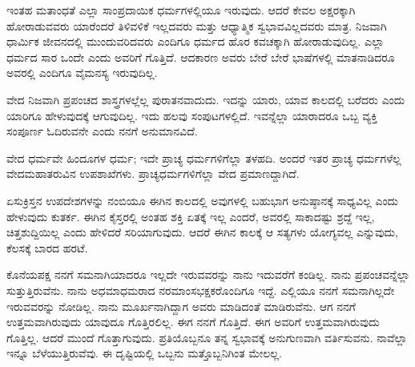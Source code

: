 ಇಂತಹ ಮತಾಂಧತೆ ಎಲ್ಲಾ ಸಾಂಪ್ರದಾಯಿಕ ಧರ್ಮಗಳಲ್ಲಿಯೂ ಇರುವುದು. ಆದರೆ ಕೇವಲ ಅಕ್ಷರಕ್ಕಾಗಿ ಹೋರಾಡುವವರು ಯಾರೆಂದರೆ ತಿಳಿವಳಿಕೆ ಇಲ್ಲದವರು ಮತ್ತು ಆಧ್ಯಾತ್ಮಿಕ ಸ್ವಭಾವವಿಲ್ಲದವರು ಮಾತ್ರ. ನಿಜವಾಗಿ ಧಾರ್ಮಿಕ ಜೀವನದಲ್ಲಿ ಮುಂದುವರಿದವರು ಎಂದಿಗೂ ಧರ್ಮದ ಹೊರ ಕವಚಕ್ಕಾಗಿ ಹೋರಾಡುವುದಿಲ್ಲ. ಎಲ್ಲಾ ಧರ್ಮದ ಸಾರ ಒಂದೇ ಎಂದು ಅವರಿಗೆ ಗೊತ್ತಿದೆ. ಆದಕಾರಣ ಅವರು ಬೇರೆ ಬೇರೆ ಭಾಷೆಗಳಲ್ಲಿ ಮಾತನಾಡಿದರೂ ಅವರಲ್ಲಿ ಎಂದಿಗೂ ವೈಮನಸ್ಯ ಇರುವುದಿಲ್ಲ.

ವೇದ ನಿಜವಾಗಿ ಪ್ರಪಂಚದ ಶಾಸ್ತ್ರಗಳಲ್ಲೆಲ್ಲ ಪುರಾತನವಾದುದು. ಇದನ್ನು ಯಾರು, ಯಾವ ಕಾಲದಲ್ಲಿ ಬರೆದರು ಎಂದು ಯಾರಿಗೂ ಹೇಳುವುದಕ್ಕೆ ಆಗುವುದಿಲ್ಲ. ಇದು ಹಲವು ಸಂಪುಟಗಳಲ್ಲಿದೆ. ಇವನ್ನೆಲ್ಲಾ ಯಾರಾದರೂ ಒಬ್ಬ ವ್ಯಕ್ತಿ ಸಂಪೂರ್ಣ ಓದಿರುವನೇ ಎಂದು ನನಗೆ ಅನುಮಾನವಿದೆ.

ವೇದ ಧರ್ಮವೇ ಹಿಂದೂಗಳ ಧರ್ಮ; ಇದೇ ಪ್ರಾಚ್ಯ ಧರ್ಮಗಳಿಗೆಲ್ಲಾ ತಳಹದಿ. ಅಂದರೆ ಇತರ ಪ್ರಾಚ್ಯ ಧರ್ಮಗಳೆಲ್ಲ ವೇದಮಹಾತರುವಿನ ಉಪಶಾಖೆಗಳು. ಪ್ರಾಚ್ಯಧರ್ಮಗಳಿಗೆಲ್ಲಾ ವೇದ ಪ್ರಮಾಣದ್ದಾಗಿದೆ. 

ಏಸುಕ್ರಿಸ್ತನ ಉಪದೇಶಗಳನ್ನು ನಂಬಿಯೂ ಈಗಿನ ಕಾಲದಲ್ಲಿ ಅವುಗಳಲ್ಲಿ ಬಹುಭಾಗ ಅನುಷ್ಠಾನಕ್ಕೆ ಸಾಧ್ಯವಿಲ್ಲ ಎಂದು ಹೇಳುವುದು ಕುತರ್ಕ. ಈಗಿನ ಕೈಸ್ತರಲ್ಲಿ ಅಂತಹ ಶಕ್ತಿ ಏತಕ್ಕೆ ಇಲ್ಲ ಎಂದರೆ, ಅವರಲ್ಲಿ ಸಾಕಾದಷ್ಟು ಶ್ರದ್ದೆ ಇಲ್ಲ, ಚಿತ್ತಶುದ್ದಿಯಿಲ್ಲ ಎಂದು ಹೇಳಿದರೆ ಸರಿಯಾಗುವುದು. ಆದರೆ ಈಗಿನ ಕಾಲಕ್ಕೆ ಆ ಸತ್ಯಗಳು ಯೋಗ್ಯವಲ್ಲ ಎನ್ನುವುದು, ಕೆಲಸಕ್ಕೆ ಬಾರದ ಹರಟೆ.

ಕೊನೆಯಪಕ್ಷ ನನಗೆ ಸಮನಾಗಿಯಾದರೂ ಇಲ್ಲದೇ ಇರುವವರನ್ನು ನಾನು ಇದುವರೆಗೆ ಕಂಡಿಲ್ಲ. ನಾನು ಪ್ರಪಂಚವನ್ನೆಲ್ಲಾ ಸುತ್ತುತ್ತಿರುವೆನು. ನಾನು ಅಧಮಾಧಮರಾದ ನರಮಾಂಸಭಕ್ಷಕರೊಂದಿಗೂ ಇದ್ದೆ. ಎಲ್ಲಿಯೂ ನನಗೆ ಸಮನಾಗಿಲ್ಲದೇ ಇರುವವರನ್ನು ನೋಡಿಲ್ಲ. ನಾನು ಮೂರ್ಖನಾಗಿದ್ದಾಗ ಅವರು ಮಾಡಿದಂತೆ ಮಾಡಿರುವೆನು. ಆಗ ನನಗೆ ಉತ್ತಮವಾಗಿರುವುದು ಯಾವುದೂ ಗೊತ್ತಿರಲಿಲ್ಲ. ಈಗ ನನಗೆ ಗೊತ್ತಿದೆ. ಈಗ ಅವರಿಗೆ ಉತ್ತಮವಾಗಿರುವುದು ಗೊತ್ತಿಲ್ಲ. ಆದರೆ ಮುಂದೆ ಗೊತ್ತಾಗುವುದು. ಪ್ರತಿಯೊಬ್ಬನೂ ತನ್ನ ಸ್ವಭಾವಕ್ಕೆ ಅನುಗುಣವಾಗಿ ವರ್ತಿಸುವನು. ನಾವೆಲ್ಲಾ ಇನ್ನೂ ಬೆಳೆಯುತ್ತಿರುವೆವು. ಈ ದೃಷ್ಟಿಯಲ್ಲಿ ಒಬ್ಬನು ಮತ್ತೊಬ್ಬನಿಗಿಂತ ಮೇಲಲ್ಲ.

